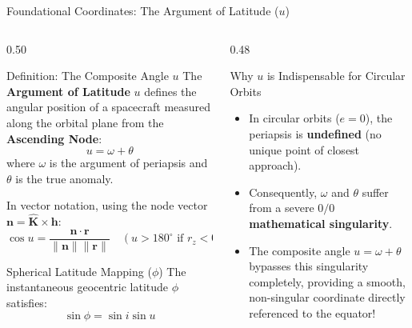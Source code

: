 \documentclass[aspectratio=169,10pt]{beamer}
\begin{document}
\begin{frame}{Foundational Coordinates: The Argument of Latitude (\texorpdfstring{$u$}{u})}
    \begin{columns}[t]
        \begin{column}{0.50\textwidth}
            \begin{block}{Definition: The Composite Angle $u$}
                \footnotesize
                The \textbf{Argument of Latitude} $u$ defines the angular position of a spacecraft measured along the orbital plane from the \textbf{Ascending Node}:
                \begin{equation}
                    u = \omega + \theta
                \end{equation}
                where $\omega$ is the argument of periapsis and $\theta$ is the true anomaly.
                
                \vspace{0.05cm}
                In vector notation, using the node vector $\mathbf{n} = \mathbf{\hat{K}} \times \mathbf{h}$:
                \begin{equation}
                    \cos u = \frac{\mathbf{n} \cdot \mathbf{r}}{\|\mathbf{n}\| \|\mathbf{r}\|} \quad (u > 180^\circ \text{ if } r_z < 0)
                \end{equation}
            \end{block}

            \begin{exampleblock}{Spherical Latitude Mapping ($\phi$)}
                \footnotesize
                The instantaneous geocentric latitude $\phi$ satisfies:
                \begin{equation}
                    \sin \phi = \sin i \sin u
                \end{equation}
            \end{exampleblock}
        \end{column}

        \begin{column}{0.48\textwidth}
            \begin{alertblock}{Why $u$ is Indispensable for Circular Orbits}
                \footnotesize
                \begin{itemize}\setlength{\itemsep}{2pt}
                    \item In circular orbits ($e = 0$), the periapsis is \textbf{undefined} (no unique point of closest approach).
                    \item Consequently, $\omega$ and $\theta$ suffer from a severe $0/0$ \textbf{mathematical singularity}.
                    \item The composite angle $u = \omega + \theta$ bypasses this singularity completely, providing a smooth, non-singular coordinate directly referenced to the equator!
                \end{itemize}
            \end{alertblock}


\end{column}
\end{columns}
\end{frame}
\end{document}
